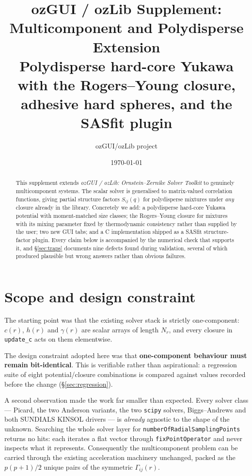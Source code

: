\documentclass[11pt,a4paper]{article}
\title{\bfseries ozGUI / ozLib Supplement:\\[2mm]
Multicomponent and Polydisperse Extension\\[1mm]
\large Polydisperse hard-core Yukawa with the Rogers--Young closure,
adhesive hard spheres, and the SASfit plugin}
\author{ozGUI/ozLib project}
\date{\today}
\newcommand{\code}[1]{\texttt{\hspace{0pt}#1}}
\begin{document}
\maketitle

\begin{abstract}
\noindent
This supplement extends \emph{ozGUI / ozLib: Ornstein--Zernike Solver
Toolkit} to genuinely multicomponent systems. The scalar solver is
generalised to matrix-valued correlation functions, giving partial structure
factors $S_{ij}(q)$ for polydisperse mixtures under \emph{any} closure already
in the library. Concretely we add: a polydisperse hard-core Yukawa potential
with moment-matched size classes; the Rogers--Young closure for mixtures with
its mixing parameter fixed by thermodynamic consistency rather than supplied
by the user; two new GUI tabs; and a C implementation shipped as a SASfit
structure-factor plugin. Every claim below is accompanied by the numerical
check that supports it, and \S\ref{sec:traps} documents nine defects found
during validation, several of which produced plausible but wrong answers
rather than obvious failures.
\end{abstract}

\tableofcontents

\section{Scope and design constraint}

The starting point was that the existing solver stack is strictly
one-component: $c(r)$, $h(r)$ and $\gamma(r)$ are scalar arrays of length
$N_r$, and every closure in \code{update\_c} acts on them elementwise.

The design constraint adopted here was that \textbf{one-component behaviour
must remain bit-identical}. This is verifiable rather than aspirational: a
regression suite of eight potential/closure combinations is compared against
values recorded before the change (\S\ref{sec:regression}).

A second observation made the work far smaller than expected. Every solver
class --- Picard, the two Anderson variants, the two \code{scipy} solvers,
Biggs--Andrews and both SUNDIALS KINSOL drivers --- is \emph{already}
agnostic to the shape of the unknown. Searching the whole solver layer for
\code{numberOfRadialSamplingPoints} returns no hits: each iterates a flat
vector through \code{fixPointOperator} and never inspects what it represents.
Consequently the multicomponent problem can be carried through the existing
acceleration machinery unchanged, packed as the $p(p+1)/2$ unique pairs of the
symmetric $\Gamma_{ij}(r)$.
\end{document}
